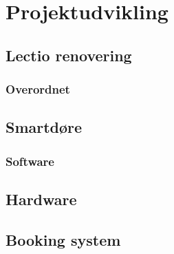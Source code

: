 \section{Projektudvikling}
    \subsection{Lectio renovering}
        \subsubsection{Overordnet}
                        
    \subsection{Smartdøre}
        \subsubsection{Software}
        \subsection{Hardware}
    \subsection{Booking system}